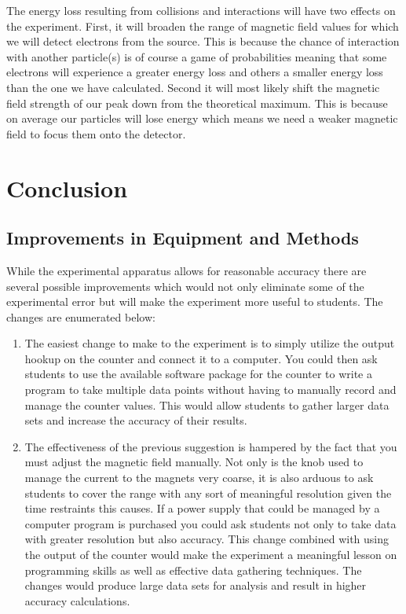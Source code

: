 The energy loss resulting from collisions and interactions will have two effects on the experiment.  First, it will broaden the range of magnetic field values for which we will detect electrons from the source. This is because the chance of interaction with another particle(s) is of course a game of probabilities meaning that some electrons will experience a greater energy loss and others a smaller energy loss than the one we have calculated.  Second it will most likely shift the magnetic field strength of our peak down from the theoretical maximum.  This is because on average our particles will lose energy which means we need a weaker magnetic field to focus them onto the detector.  
  


\section{Conclusion}
\subsection{Improvements in Equipment and Methods}
While the experimental apparatus allows for reasonable accuracy there are several possible improvements which would not only eliminate some of the experimental error but will make the experiment more useful to students.  The changes are enumerated below:
\begin{enumerate}
\item The easiest change to make to the experiment is to simply utilize the output hookup on the counter and connect it to a computer. You could then ask students to use the available software package for the counter to write a program to take multiple data points without having to manually record and manage the counter values.  This would allow students to gather larger data sets and increase the accuracy of their results. 
\item The effectiveness of the previous suggestion is hampered by the fact that you must adjust the magnetic field manually.  Not only is the knob used to manage the current to the magnets very coarse, it is also arduous to ask students to cover the range with any sort of meaningful resolution given the time restraints this causes.  If a power supply that could be managed by a computer program is purchased you could ask students not only to take data with greater resolution but also accuracy. This change combined with using the output of the counter would make the experiment a meaningful lesson on programming skills as well as effective data gathering techniques. The changes would produce large data sets for analysis and result in higher accuracy calculations.  
\end{enumerate} 


